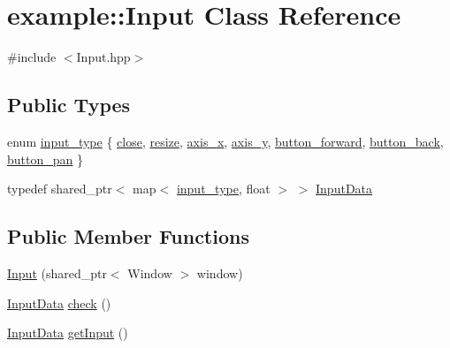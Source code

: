 \hypertarget{classexample_1_1_input}{}\section{example\+:\+:Input Class Reference}
\label{classexample_1_1_input}


{\ttfamily \#include $<$Input.\+hpp$>$}

\subsection*{Public Types}
\begin{DoxyCompactItemize}
\item 
enum \mbox{\hyperlink{classexample_1_1_input_a315efe66cfd6b49cbe0f46ab46ece59f}{input\+\_\+type}} \{ \newline
\mbox{\hyperlink{classexample_1_1_input_a315efe66cfd6b49cbe0f46ab46ece59fab257fe2f5ed273f10e2dab9437dce0d1}{close}}, 
\mbox{\hyperlink{classexample_1_1_input_a315efe66cfd6b49cbe0f46ab46ece59fa4798b64ed7b9b9c65d9a313aa9081be2}{resize}}, 
\mbox{\hyperlink{classexample_1_1_input_a315efe66cfd6b49cbe0f46ab46ece59faa88126e258a0d04e118d555d36f45b09}{axis\+\_\+x}}, 
\mbox{\hyperlink{classexample_1_1_input_a315efe66cfd6b49cbe0f46ab46ece59faf30367b3bb847290e4cb55249a3bccf5}{axis\+\_\+y}}, 
\newline
\mbox{\hyperlink{classexample_1_1_input_a315efe66cfd6b49cbe0f46ab46ece59fa1707e1d189e8fdf6adacf1aa5d4e22a9}{button\+\_\+forward}}, 
\mbox{\hyperlink{classexample_1_1_input_a315efe66cfd6b49cbe0f46ab46ece59fa379b0f4c9bbd1b78df38037a213e24dd}{button\+\_\+back}}, 
\mbox{\hyperlink{classexample_1_1_input_a315efe66cfd6b49cbe0f46ab46ece59fae744adfc1878946c23375555ec240cc3}{button\+\_\+pan}}
 \}
\item 
typedef shared\+\_\+ptr$<$ map$<$ \mbox{\hyperlink{classexample_1_1_input_a315efe66cfd6b49cbe0f46ab46ece59f}{input\+\_\+type}}, float $>$ $>$ \mbox{\hyperlink{classexample_1_1_input_a574fd91f61d018474389e778c31e0da2}{Input\+Data}}
\end{DoxyCompactItemize}
\subsection*{Public Member Functions}
\begin{DoxyCompactItemize}
\item 
\mbox{\hyperlink{classexample_1_1_input_a7784c5ddeff5d467d26daef96cd4a303}{Input}} (shared\+\_\+ptr$<$ Window $>$ window)
\item 
\mbox{\hyperlink{classexample_1_1_input_a574fd91f61d018474389e778c31e0da2}{Input\+Data}} \mbox{\hyperlink{classexample_1_1_input_a0a4492b08db16e638a4cd7bcf56a70ed}{check}} ()
\item 
\mbox{\hyperlink{classexample_1_1_input_a574fd91f61d018474389e778c31e0da2}{Input\+Data}} \mbox{\hyperlink{classexample_1_1_input_a9db162ac185cdf3a9f77fb9c49158f51}{get\+Input}} ()
\end{DoxyCompactItemize}


